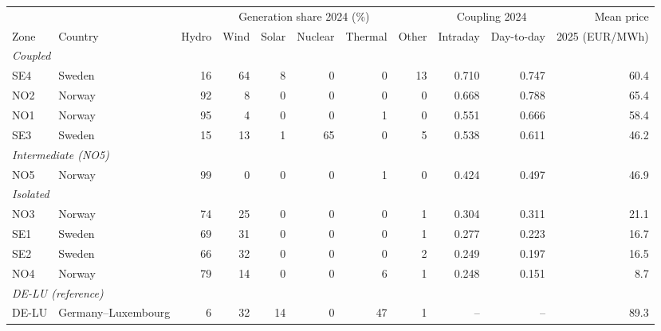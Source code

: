 \begin{tabular}{llrrrrrrrrr}
\toprule
 & & \multicolumn{6}{c}{Generation share 2024 (\%)} & \multicolumn{2}{c}{Coupling 2024} & Mean price \\
\cmidrule(lr){3-8} \cmidrule(lr){9-10}
Zone & Country & Hydro & Wind & Solar & Nuclear & Thermal & Other & Intraday & Day-to-day & 2025 (EUR/MWh) \\
\midrule
\multicolumn{11}{l}{\textit{Coupled}} \\
SE4 & Sweden & 16 & 64 & 8 & 0 & 0 & 13 & 0.710 & 0.747 & 60.4 \\
NO2 & Norway & 92 & 8 & 0 & 0 & 0 & 0 & 0.668 & 0.788 & 65.4 \\
NO1 & Norway & 95 & 4 & 0 & 0 & 1 & 0 & 0.551 & 0.666 & 58.4 \\
SE3 & Sweden & 15 & 13 & 1 & 65 & 0 & 5 & 0.538 & 0.611 & 46.2 \\
\midrule
\multicolumn{11}{l}{\textit{Intermediate (NO5)}} \\
NO5 & Norway & 99 & 0 & 0 & 0 & 1 & 0 & 0.424 & 0.497 & 46.9 \\
\midrule
\multicolumn{11}{l}{\textit{Isolated}} \\
NO3 & Norway & 74 & 25 & 0 & 0 & 0 & 1 & 0.304 & 0.311 & 21.1 \\
SE1 & Sweden & 69 & 31 & 0 & 0 & 0 & 1 & 0.277 & 0.223 & 16.7 \\
SE2 & Sweden & 66 & 32 & 0 & 0 & 0 & 2 & 0.249 & 0.197 & 16.5 \\
NO4 & Norway & 79 & 14 & 0 & 0 & 6 & 1 & 0.248 & 0.151 & 8.7 \\
\midrule
\multicolumn{11}{l}{\textit{DE-LU (reference)}} \\
DE-LU & Germany--Luxembourg & 6 & 32 & 14 & 0 & 47 & 1 & -- & -- & 89.3 \\
\bottomrule
\end{tabular}
